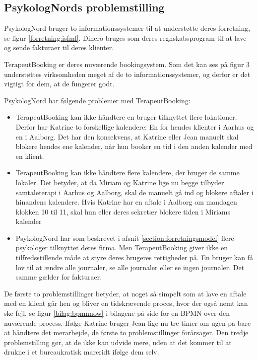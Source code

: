 \subsection{PsykologNords problemstilling}
\label{section:problemstilling}

PsykologNord bruger to informationssystemer til at understøtte deres forretning, se figur \ref{forretning:isfml}.
Dinero bruges som deres regnskabsprogram til at lave og sende fakturaer til deres klienter.

TerapeutBooking er deres nuværende bookingsystem.
Som det kan ses på figur 3 understøttes virksomheden meget af de to informationssystemer, og derfor er det vigtigt for dem, at de fungerer godt.

PsykologNord har følgende problemer med TerapeutBooking:

\begin{itemize}
    \item TerapeutBooking kan ikke håndtere en bruger tilknyttet flere lokationer.
    Derfor har Katrine to forskellige kalendere: En for hendes klienter i Aarhus og en i Aalborg.
    Det har den konsekvens, at Katrine eller Jean manuelt skal blokere hendes ene kalender, når hun booker en tid i den anden kalender med en klient.
    
    \item TerapeutBooking kan ikke håndtere flere kalendere, der bruger de samme lokaler.
    Det betyder, at da Miriam og Katrine lige nu begge tilbyder samtaleterapi i Aarhus og Aalborg, skal de manuelt gå ind og blokere aftaler i hinandens kalendere.
    Hvis Katrine har en aftale i Aalborg om mandagen klokken 10 til 11, skal hun eller deres sekretær blokere tiden i Miriams kalender
    
   \item PsykologNord har som beskrevet i afsnit \ref{section:forretningsmodel} flere psykologer tilknyttet deres firma.
   Men TerapeutBooking giver ikke en tilfredsstillende måde at styre deres brugeres rettigheder på.
   En bruger kan få lov til at ændre alle journaler, se alle journaler eller se ingen journaler.
   Det samme gælder for fakturaer.
\end{itemize}

De første to problemstillinger betyder, at noget så simpelt som at lave en aftale med en klient går hen og bliver en tidskrævende proces, hvor der også nemt kan ske fejl, se figur \ref{bilag:bpmnnow} i bilagene på side \pageref{bilag:bpmnnow} for en BPMN over den nuværende process.
Ifølge Katrine bruger Jean lige nu tre timer om ugen på bare at håndtere det merarbejde, de første to problemstillinger forårsager.
Den tredje problemstilling gør, at de ikke kan udvide mere, uden at det kommer til at drukne i et bureaukratisk mareridt ifølge dem selv.

